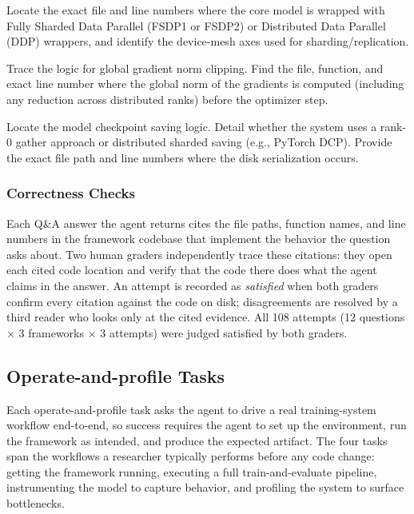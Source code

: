 Locate the exact file and line numbers where the core model is
wrapped with Fully Sharded Data Parallel (FSDP1 or FSDP2) or
Distributed Data Parallel (DDP) wrappers, and identify the
device-mesh axes used for sharding/replication.

Trace the logic for global gradient norm clipping. Find the file,
function, and exact line number where the global norm of the
gradients is computed (including any reduction across distributed
ranks) before the optimizer step.

Locate the model checkpoint saving logic. Detail whether the system
uses a rank-0 gather approach or distributed sharded saving (e.g.,
PyTorch DCP). Provide the exact file path and line numbers where the
disk serialization occurs.

\subsubsection{Correctness Checks}
\label{sec:appendix:tasks:qa-correctness}

Each Q\&A answer the agent returns cites the file paths, function
names, and line numbers in the framework codebase that implement
the behavior the question asks about. Two human graders
independently trace these citations: they open each cited code
location and verify that the code there does what the agent claims
in the answer. An attempt is recorded as \emph{satisfied} when both
graders confirm every citation against the code on disk;
disagreements are resolved by a third reader who looks only at the
cited evidence. All 108 attempts (12 questions $\times$ 3
frameworks $\times$ 3 attempts) were judged satisfied by both
graders.

\subsection{Operate-and-profile Tasks}
\label{sec:appendix:tasks:operate}

Each operate-and-profile task asks the agent to drive a real
training-system workflow end-to-end, so success requires the agent
to set up the environment, run the framework as intended, and
produce the expected artifact. The four tasks span the workflows
a researcher typically performs before any code change: getting
the framework running, executing a full train-and-evaluate
pipeline, instrumenting the model to capture behavior, and
profiling the system to surface bottlenecks.

